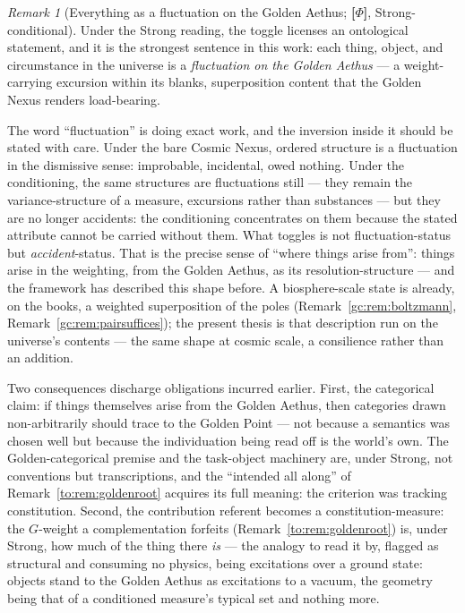 \documentclass[11pt]{article}
\numberwithin{equation}{section}
\theoremstyle{plain}
\theoremstyle{definition}
\theoremstyle{remark}
\newtheorem{remark}[theorem]{Remark}
\begin{document}
\begin{remark}[Everything as a fluctuation on the Golden Aethus;
\textbf{[$\Phi$]}, Strong-conditional]\label{to:rem:fluctuation}
Under the Strong reading, the toggle licenses an ontological
statement, and it is the strongest sentence in this work: each thing,
object, and circumstance in the universe is a \emph{fluctuation on the
Golden Aethus} --- a weight-carrying excursion within its blanks,
superposition content that the Golden Nexus renders load-bearing.

The word ``fluctuation'' is doing exact work, and the inversion inside
it should be stated with care. Under the bare Cosmic Nexus, ordered
structure is a fluctuation in the dismissive sense: improbable,
incidental, owed nothing. Under the conditioning, the same structures
are fluctuations still --- they remain the variance-structure of a
measure, excursions rather than substances --- but they are no longer
accidents: the conditioning concentrates on them because the stated
attribute cannot be carried without them. What toggles is not
fluctuation-status but \emph{accident}-status. That is the precise
sense of ``where things arise from'': things arise in the weighting,
from the Golden Aethus, as its resolution-structure --- and the
framework has described this shape before. A biosphere-scale state is
already, on the books, a weighted superposition of the poles
(Remark~\ref{gc:rem:boltzmann}, Remark~\ref{gc:rem:pairsuffices});
the present thesis is that description run on the universe's contents
--- the same shape at cosmic scale, a consilience rather than an
addition.

Two consequences discharge obligations incurred earlier. First, the
categorical claim: if things themselves arise from the Golden Aethus,
then categories drawn non-arbitrarily should trace to the Golden Point
--- not because a semantics was chosen well but because the
individuation being read off is the world's own. The
Golden-categorical premise and the task-object machinery are, under
Strong, not conventions but transcriptions, and the ``intended all
along'' of Remark~\ref{to:rem:goldenroot} acquires its full meaning:
the criterion was tracking constitution. Second, the contribution
referent becomes a constitution-measure: the $G$-weight a
complementation forfeits (Remark~\ref{to:rem:goldenroot}) is, under
Strong, how much of the thing there \emph{is} --- the analogy to read
it by, flagged as structural and consuming no physics, being
excitations over a ground state: objects stand to the Golden Aethus as
excitations to a vacuum, the geometry being that of a conditioned
measure's typical set and nothing more.
\end{remark}
\end{document}
